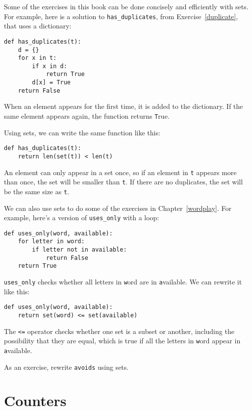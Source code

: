 \documentclass[
DIV=11,
fontsize=13,
twoside,
headinclude=false,
titlepage=firstiscover,
abstract=true,
headsepline=true,
footsepline=true,
chapterprefix=true, %
headings=big,
bibliography=totoc,%
captions=tableheading
]{scrbook}
\theoremstyle{definition}
\begin{document}
Some of the exercises in this book can be done concisely and
efficiently with sets.  For example, here is a solution to
\verb"has_duplicates", from
Exercise~\ref{duplicate}, that uses a dictionary:

\begin{lstlisting}
def has_duplicates(t):
    d = {}
    for x in t:
        if x in d:
            return True
        d[x] = True
    return False
\end{lstlisting}

When an element appears for the first time, it is added to the
dictionary.  If the same element appears again, the function returns
{\texttt True}.

Using sets, we can write the same function like this:

\begin{lstlisting}
def has_duplicates(t):
    return len(set(t)) < len(t)
\end{lstlisting}
%
An element can only appear in a set once, so if an element in {\texttt t}
appears more than once, the set will be smaller than {\texttt t}.  If there
are no duplicates, the set will be the same size as {\texttt t}.

We can also use sets to do some of the exercises in
Chapter~\ref{wordplay}.  For example, here's a version of
\verb"uses_only" with a loop:

\begin{lstlisting}
def uses_only(word, available):
    for letter in word: 
        if letter not in available:
            return False
    return True
\end{lstlisting}
%
\verb"uses_only" checks whether all letters in {\texttt word} are
in {\texttt available}.  We can rewrite it like this:

\begin{lstlisting}
def uses_only(word, available):
    return set(word) <= set(available)
\end{lstlisting}
%
The \verb"<=" operator checks whether one set is a subset or another,
including the possibility that they are equal, which is true if all
the letters in {\texttt word} appear in {\texttt available}.

As an exercise, rewrite \verb"avoids" using sets.


\section{Counters}
\end{document}
